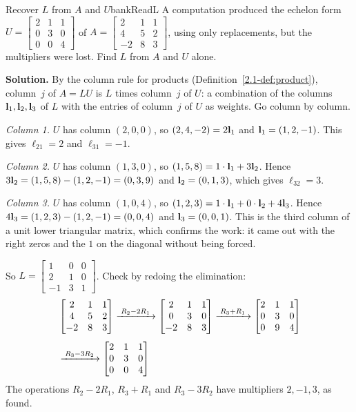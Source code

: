 \documentclass[11pt]{article}
\begin{document}
\begin{exmp}{Recover $L$ from $A$ and $U$}{bankReadL}
A computation produced the echelon form $U=\begin{bmatrix}2&1&1\\0&3&0\\0&0&4\end{bmatrix}$ of $A=\begin{bmatrix}2&1&1\\4&5&2\\-2&8&3\end{bmatrix}$, using only replacements, but the multipliers were lost. Find $L$ from $A$ and $U$ alone.

\textbf{Solution.} By the column rule for products (Definition~\ref{2.1-def:product}), column~$j$ of $A=LU$ is $L$ times column~$j$ of $U$: a combination of the columns $\mathbf{l}_1,\mathbf{l}_2,\mathbf{l}_3$ of $L$ with the entries of column~$j$ of $U$ as weights. Go column by column.

\emph{Column 1.} $U$ has column $(2,0,0)$, so $(2,4,-2)=2\mathbf{l}_1$ and $\mathbf{l}_1=(1,2,-1)$. This gives $\ell_{21}=2$ and $\ell_{31}=-1$.

\emph{Column 2.} $U$ has column $(1,3,0)$, so $(1,5,8)=1\cdot\mathbf{l}_1+3\mathbf{l}_2$. Hence $3\mathbf{l}_2=(1,5,8)-(1,2,-1)=(0,3,9)$ and $\mathbf{l}_2=(0,1,3)$, which gives $\ell_{32}=3$.

\emph{Column 3.} $U$ has column $(1,0,4)$, so $(1,2,3)=1\cdot\mathbf{l}_1+0\cdot\mathbf{l}_2+4\mathbf{l}_3$. Hence $4\mathbf{l}_3=(1,2,3)-(1,2,-1)=(0,0,4)$ and $\mathbf{l}_3=(0,0,1)$. This is the third column of a unit lower triangular matrix, which confirms the work: it came out with the right zeros and the $1$ on the diagonal without being forced.

So $L=\begin{bmatrix}1&0&0\\2&1&0\\-1&3&1\end{bmatrix}$. Check by redoing the elimination:
\begin{align*}
&\begin{bmatrix}2&1&1\\4&5&2\\-2&8&3\end{bmatrix}
\xrightarrow{\;R_2-2R_1\;}
\begin{bmatrix}2&1&1\\0&3&0\\-2&8&3\end{bmatrix}
\xrightarrow{\;R_3+R_1\;}
\begin{bmatrix}2&1&1\\0&3&0\\0&9&4\end{bmatrix}\\[4pt]
&\xrightarrow{\;R_3-3R_2\;}
\begin{bmatrix}2&1&1\\0&3&0\\0&0&4\end{bmatrix}
\end{align*}
The operations $R_2-2R_1$, $R_3+R_1$ and $R_3-3R_2$ have multipliers $2,-1,3$, as found.


\end{exmp}
\end{document}
